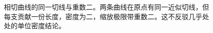 \begin{figure}[htbp]
\begin{tikzpicture}[x=1cm,y=1cm,>=stealth,every node/.style={font=\small},line width=.65pt]
\end{tikzpicture}
\caption[相切曲线的同一切线与重数二]{相切曲线的同一切线与重数二。两条曲线在原点有同一近似切线，但每支贡献一份长度，密度为二，缩放极限带重数二。这不反驳几乎处处的单位密度结论。}
\label{b1:fig:visual-f14}
\end{figure}

